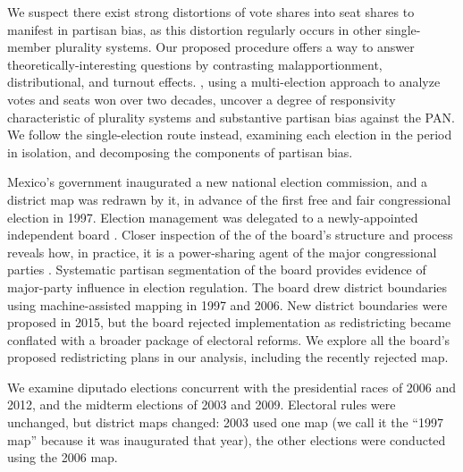 \documentclass[letter,12pt]{article}
\begin{document}
We suspect there exist strong distortions of vote shares into seat shares to manifest in partisan bias, as this distortion regularly occurs in other single-member plurality systems. Our proposed procedure offers a way to answer theoretically-interesting questions by contrasting malapportionment, distributional, and turnout effects. \citet{marquez2014biasBlog}, using a multi-election approach to analyze votes and seats won over two decades, uncover a degree of responsivity characteristic of plurality systems and substantive partisan bias against the PAN. We follow the single-election route instead, examining each election in the period in isolation, and decomposing the components of partisan bias. 

Mexico's government inaugurated a new national election commission, and a district map was redrawn by it, in advance of the first free and fair congressional election in 1997. Election management was delegated to a newly-appointed independent board \citep[the Federal Electoral Institute IFE, see][]{lujambio.vives.2008}. Closer inspection of the of the board's structure and process reveals how, in practice, it is a power-sharing agent of the major congressional parties \citep{estevez.magar.rosas.2008}. Systematic partisan segmentation of the board provides evidence of major-party influence in election regulation. The board drew district boundaries using machine-assisted mapping in 1997 and 2006. New district boundaries were proposed in 2015, but the board rejected implementation as redistricting became conflated with a broader package of electoral reforms. We explore all the board's proposed redistricting plans in our analysis, including the recently rejected map. 

We examine diputado elections concurrent with the presidential races of 2006 and 2012, and the midterm elections of 2003 and 2009. Electoral rules were unchanged, but district maps changed: 2003 used one map (we call it the ``1997 map'' because it was inaugurated that year), the other elections were conducted using the 2006 map. 
\end{document}
